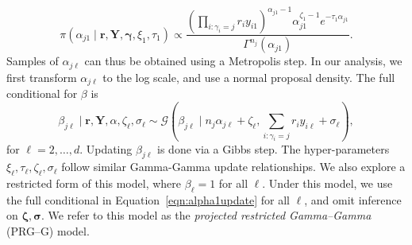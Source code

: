 \begin{equation}
    \label{eqn:alpha1update}
    \pi(\alpha_{j1}\mid\bm{r},\bm{Y},\bm{\gamma},\xi_1,\tau_1) \propto \frac{\left(\prod_{i:\gamma_i = j}r_iy_{i1}\right)^{\alpha_{j1} - 1}\alpha_{j1}^{\zeta_1 - 1}e^{-\tau_1\alpha_{j1}}}{\Gamma^{n_j}(\alpha_{j1})}.
\end{equation}
Samples of $\alpha_{j\ell}$ can thus be obtained using a Metropolis step. In our analysis, we first transform $\alpha_{j\ell}$ to the log scale, and use a normal proposal density.
The full conditional for $\beta$ is 
\begin{equation}
    \label{eqn:betafc}
    \beta_{j\ell}\mid\bm{r},\bm{Y},\alpha,\zeta_{\ell},\sigma_{\ell} \sim \mathcal{G}\left(\beta_{j\ell}\mid n_j\alpha_{j\ell} + \zeta_\ell, \sum_{i:\gamma_i = j}r_iy_{i\ell} + \sigma_{\ell}\right),
\end{equation}
for $\ell = 2,\ldots, d$.  Updating $\beta_{j\ell}$ is done via a Gibbs step.  The hyper-parameters $\xi_{\ell},\tau_{\ell},\zeta_{\ell},\sigma_{\ell}$ follow similar Gamma-Gamma update relationships.  We also explore a restricted form of this model, where $\beta_{\ell} = 1$ for all $\ell$.  Under this model, we use the full conditional in Equation~\ref{eqn:alpha1update} for all $\ell$, and omit inference on $\bm{\zeta},\bm{\sigma}$.  We refer to this model as the \emph{projected restricted Gamma--Gamma} (PRG--G) model.

